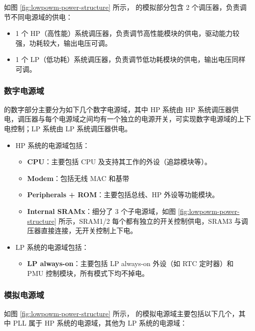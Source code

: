 \documentclass[main\_\_CN.tex]{subfiles}
\begin{document}
如图 \ref{fig:lowpowm-power-structure} 所示，\chipname{} 的模拟部分包含 2 个调压器，负责调节不同电源域的供电：

\begin{itemize}
    \item 1 个 HP（高性能）系统调压器，负责调节高性能模块的供电，驱动能力较强，功耗较大，输出电压可调。
    \item 1 个 LP（低功耗）系统调压器，负责调节低功耗模块的供电，输出电压同样可调。
\end{itemize}


\subsubsection{数字电源域}\label{sec:lowpowm_digital_domain}

\chipname{} 的数字部分主要分为如下几个数字电源域，其中 HP 系统由 HP 系统调压器供电，调压器与每个电源域之间均有一个独立的电源开关，可实现数字电源域的上下电控制；LP 系统由 LP 系统调压器供电。

\begin{itemize}
    \item HP 系统的电源域包括：
    \begin{itemize}
        \item \textbf{CPU}：主要包括 CPU 及支持其工作的外设（追踪模块等）。
        \item \textbf{Modem}：包括无线 MAC 和基带
        \item \textbf{Peripherals + ROM}：主要包括总线、HP 外设等功能模块。

        \item \textbf{Internal SRAMx}：细分了 3 个子电源域，如图 \ref{fig:lowpowm-power-structure} 所示，SRAM1/2 每个都有独立的开关控制供电，SRAM3 与调压器直接连接，无开关控制上下电。
    \end{itemize}
    \item LP 系统的电源域包括：
    \begin{itemize}
        \item \textbf{LP always-on}：主要包括 LP always-on 外设（如 RTC 定时器）和 PMU 控制模块，所有模式下均不掉电。
    \end{itemize}
\end{itemize}

\subsubsection{模拟电源域}

如图 \ref{fig:lowpowm-power-structure} 所示，\chipname{} 的模拟电源域主要包括以下几个，其中 PLL 属于 HP 系统的电源域，其他为 LP 系统的电源域：
\end{document}
